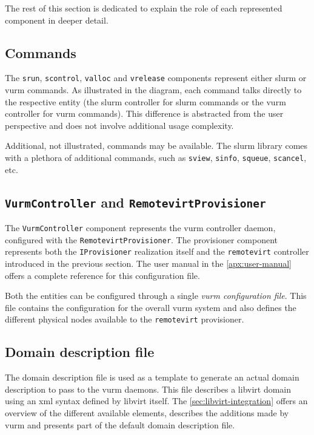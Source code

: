 The rest of this section is dedicated to explain the role of each represented component in deeper detail.

\subsection*{Commands}

The \texttt{srun}, \texttt{scontrol}, \texttt{valloc} and \texttt{vrelease} components represent either \gls{slurm} or \gls{vurm} commands. As illustrated in the diagram, each command talks directly to the respective entity (the \gls{slurm} controller for \gls{slurm} commands or the \gls{vurm} controller for \gls{vurm} commands). This difference is abstracted from the user perspective and does not involve additional usage complexity.

Additional, not illustrated, commands may be available. The \gls{slurm} library comes with a plethora of additional commands, such as \texttt{sview}, \texttt{sinfo}, \texttt{squeue}, \texttt{scancel}, etc.

\subsection*{\texttt{VurmController} and \texttt{RemotevirtProvisioner}}

The \texttt{VurmController} component represents the \gls{vurm} controller daemon, configured with the \texttt{RemotevirtProvisioner}. The provisioner component represents both the \texttt{IProvisioner} realization itself and the \texttt{remotevirt} controller introduced in the previous section. The user manual in the \autoref{apx:user-manual} offers a complete reference for this configuration file.

Both the entities can be configured through a single \emph{\gls{vurm} configuration file}. This file contains the configuration for the overall \gls{vurm} system and also defines the different physical nodes available to the \texttt{remotevirt} provisioner.

\subsection*{Domain description file}

The domain description file is used as a template to generate an actual domain description to pass to the \gls{vurm} daemons. This file describes a libvirt domain using an \gls{xml} syntax defined by libvirt itself. The \autoref{sec:libvirt-integration} offers an overview of the different available elements, describes the additions made by \gls{vurm} and presents part of the default domain description file.

